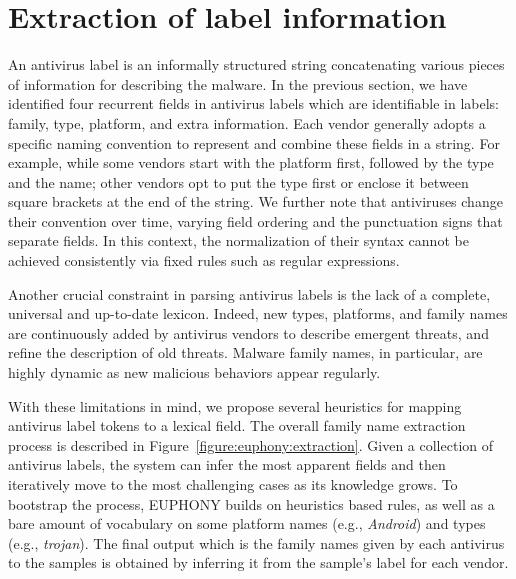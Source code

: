 \section{Extraction of label information}
An antivirus label is an informally structured string concatenating various pieces of information for describing the malware.
In the previous section, we have identified four recurrent fields in antivirus labels which are identifiable in labels: family, type, platform, and extra information.
Each vendor generally adopts a specific naming convention to represent and combine these fields in a string.
For example, while some vendors start with the platform first, followed by the type and the name; other vendors opt to put the type first or enclose it between square brackets at the end of the string.
We further note that antiviruses change their convention over time, varying field ordering and the punctuation signs that separate fields.
In this context, the normalization of their syntax cannot be achieved consistently via fixed rules such as regular expressions.

Another crucial constraint in parsing antivirus labels is the lack of a complete, universal and up-to-date lexicon.
Indeed, new types, platforms, and family names are continuously added by antivirus vendors to describe emergent threats, and refine the description of old threats.
Malware family names, in particular, are highly dynamic as new malicious behaviors appear regularly.

With these limitations in mind, we propose several heuristics for mapping antivirus label tokens to a lexical field.
The overall family name extraction process is described in Figure~\ref{figure:euphony:extraction}.
Given a collection of antivirus labels, the system can infer the most apparent fields and then iteratively move to the most challenging cases as its knowledge grows.
To bootstrap the process, EUPHONY builds on heuristics based rules, as well as a bare amount of vocabulary on some platform names (e.g., \textit{Android}) and types (e.g., \textit{trojan}).
The final output which is the family names given by each antivirus to the samples is obtained by inferring it from the sample's label for each vendor.

